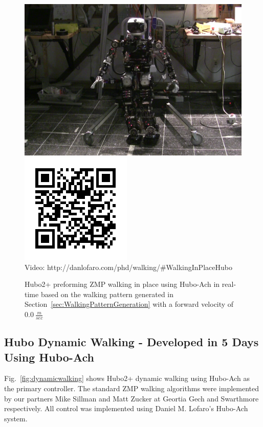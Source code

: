 \begin{figure}[thpb]
  \centering
\includegraphics[width=0.6\columnwidth]{./examples/pix/hubo-walkinginplace.png}
\includegraphics[width=0.3\columnwidth]{./qrcode/qrcode-hubo-walkinginplace.png}\\
      Video: http://danlofaro.com/phd/walking/\#WalkingInPlaceHubo
  \caption{Hubo2+ preforming ZMP walking in place using Hubo-Ach in real-time based on the walking pattern generated in Section~\ref{sec:WalkingPatternGeneration} with a forward velocity of $0.0~\frac{m}{sec}$}
  \label{fig:RealHuboWalkingInPlaceVideo}
\end{figure}





\subsection{Hubo Dynamic Walking - Developed in 5 Days Using Hubo-Ach}\label{sec:dynamicWalking}
Fig.~\ref{fig:dynamicwalking} shows Hubo2+ dynamic walking using Hubo-Ach as the primary controller.  The standard ZMP walking algorithms were implemented by our partners Mike Sillman and Matt Zucker at Geortia Gech and Swarthmore respectively.  All control was implemented using Daniel M. Lofaro's Hubo-Ach system.


